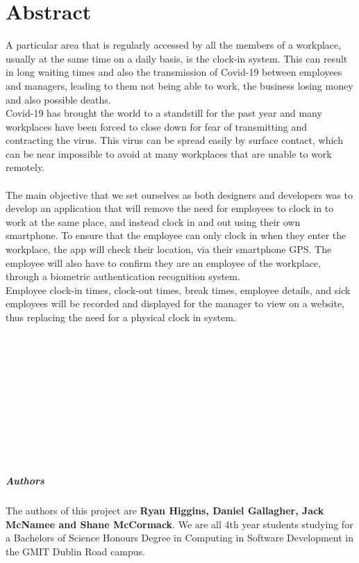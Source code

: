 

\chapter*{Abstract}
A particular area that is regularly accessed by all the members of a workplace, usually at the same time on a daily basis, is the clock-in system. This can result in long waiting times and also the transmission of Covid-19 between employees and managers, leading to them not being able to work, the business losing money and also possible deaths. \\
Covid-19 has brought the world to a standstill for the past year and many workplaces have been forced to close down for fear of transmitting and contracting the virus. This virus can be spread easily by surface contact, which can be near impossible to avoid at many workplaces that are unable to work remotely. \\
\\
The main objective that we set ourselves as both designers and developers was to develop an application that will remove the need for employees to clock in to work at the same place, and instead clock in and out using their own smartphone. To ensure that the employee can only clock in when they enter the workplace, the app will check their location, via their smartphone GPS. The employee will also have to confirm they are an employee of the workplace, through a biometric authentication recognition system. \\
Employee clock-in times, clock-out times, break times, employee details, and sick employees will be recorded and displayed for the manager to view on a website, thus replacing the need for a physical clock in system.
\\
\\
\\
\\
\\
\\
\\
\\
\\
\\
\\

\paragraph{Authors \\}
The authors of this project are \textbf{Ryan Higgins, Daniel Gallagher, Jack McNamee and Shane McCormack}. We are all 4th year students studying for a Bachelors of Science Honours Degree in Computing in Software Development in the GMIT Dublin Road campus.

